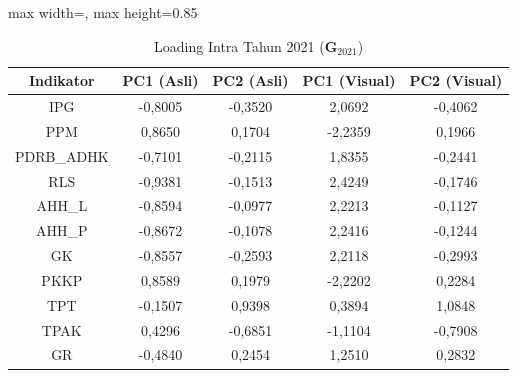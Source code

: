 \begin{table}[H]
\centering
\caption{Loading Intra Tahun 2021 ($\mathbf{G}_{2021}$)} \label{tab:app2loading_intra_2021}
\begin{adjustbox}{max width=\textwidth, max height=0.85\textheight}
\begin{tabular}{|c|c|c|c|c|}
\hline
\textbf{Indikator} & \textbf{PC1 (Asli)} & \textbf{PC2 (Asli)} & \textbf{PC1 (Visual)} & \textbf{PC2 (Visual)} \\
\hline
IPG & -0,8005 & -0,3520 & 2,0692 & -0,4062 \\
PPM & 0,8650 & 0,1704 & -2,2359 & 0,1966 \\
PDRB\_ADHK & -0,7101 & -0,2115 & 1,8355 & -0,2441 \\
RLS & -0,9381 & -0,1513 & 2,4249 & -0,1746 \\
AHH\_L & -0,8594 & -0,0977 & 2,2213 & -0,1127 \\
AHH\_P & -0,8672 & -0,1078 & 2,2416 & -0,1244 \\
GK & -0,8557 & -0,2593 & 2,2118 & -0,2993 \\
PKKP & 0,8589 & 0,1979 & -2,2202 & 0,2284 \\
TPT & -0,1507 & 0,9398 & 0,3894 & 1,0848 \\
TPAK & 0,4296 & -0,6851 & -1,1104 & -0,7908 \\
GR & -0,4840 & 0,2454 & 1,2510 & 0,2832 \\
\hline
\end{tabular}
\end{adjustbox}
\end{table}